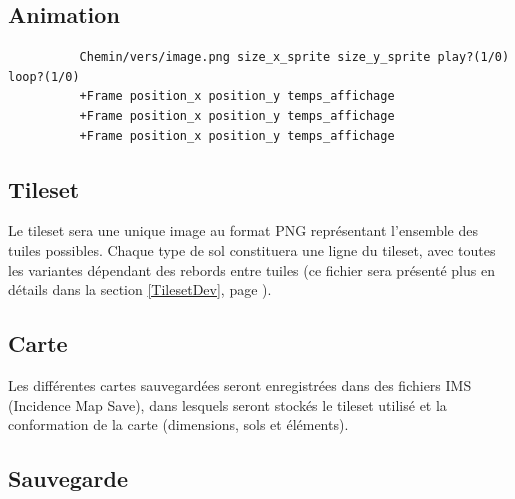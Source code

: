 \documentclass[a4paper]{article}
\newcommand{\alinea}{\hspace*{0.5cm}}
\begin{document}
      \subsection{Animation}
        \begin{verbatim}
          Chemin/vers/image.png size_x_sprite size_y_sprite play?(1/0) loop?(1/0)
          +Frame position_x position_y temps_affichage
          +Frame position_x position_y temps_affichage
          +Frame position_x position_y temps_affichage
        \end{verbatim}
      
      \subsection{Tileset}
	    \alinea Le tileset sera une unique image au format PNG représentant l'ensemble des tuiles possibles. Chaque type de sol constituera une ligne du tileset, avec toutes les variantes dépendant des rebords entre tuiles (ce fichier sera présenté plus en détails dans la section \ref{TilesetDev}, page \pageref{TilesetDev}).

      \subsection{Carte}
	    \alinea Les différentes cartes sauvegardées seront enregistrées dans des fichiers IMS (Incidence Map Save), dans lesquels seront stockés le tileset utilisé et la conformation de la carte (dimensions, sols et éléments).
      
      \subsection{Sauvegarde}
      
\end{document}
